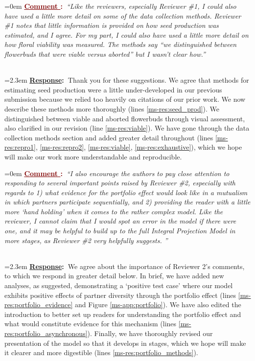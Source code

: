 \documentclass[12pt]{article}
\newcounter{cN}
\newcommand{\comment}[1]{
	\vspace{2em}
	\refstepcounter{cN} %
	\noindent \hangindent=0em \textbf{\textcolor{Maroon}{\uline{Comment \thecN}:~}}\emph{``#1''}
	}
\newcommand{\response}[1]{
	\\[0.25em]
	\hangindent=2.3em \textbf{\textcolor{NavyBlue}{\uline{Response}:~}}#1
	}
\begin{document}
\comment{Like the reviewers, especially Reviewer \#1, I could also have used a little more detail on some of the data collection methods. Reviewer \#1 notes that little information is provided on how seed production was estimated, and I agree. For my part, I could also have used a little more detail on how floral viability was measured. The methods say “we distinguished between flowerbuds that were viable versus aborted” but I wasn’t clear how.}
\response{Thank you for these suggestions. 
	We agree that methods for estimating seed production were a little under-developed in our previous submission because we relied too heavily on citations of our prior work. 
	We now describe these methods more thoroughly (lines \ref{ms-res:seed_prod}). 
	We distinguished between viable and aborted flowerbuds through visual assessment, also clarified in our revision (line \ref{ms-res:viable}). 
	We have gone through the data collection methods section and added greater detail throughout (lines \ref{ms-res:repro1}, \ref{ms-res:repro2},  \ref{ms-res:viable}, \ref{ms-res:exhaustive}), which we hope will make our work more understandable and reproducible.}

\comment{I also encourage the authors to pay close attention to responding to several important points raised by Reviewer \#2, especially with regards to 1) what evidence for the portfolio effect would look like in a mutualism in which partners participate sequentially, and 2) providing the reader with a little more ‘hand holding’ when it comes to the rather complex model. Like the reviewer, I cannot claim that I would spot an error in the model if there were one, and it may be helpful to build up to the full Integral Projection Model in more stages, as Reviewer \#2 very helpfully suggests. }
\response{We agree about the importance of Reviewer 2's comments, to which we respond in greater detail below. 
	In brief, we have added new analyses, as suggested, demonstrating a `positive test case' where our model exhibits positive effects of partner diversity through the portfolio effect (lines \ref{ms-res:portfolio_evidence} and Figure \ref{ms-app:portfolio}). 
	We have also edited the introduction to better set up readers for understanding the portfolio effect and what would constitute evidence for this mechanism (lines \ref{ms-res:portfolio_asynchronous}). 
	Finally, we have thoroughly revised our presentation of the model so that it develops in stages, which we hope will make it clearer and more digestible (lines \ref{ms-res:portfolio_methods}). }
\end{document}

